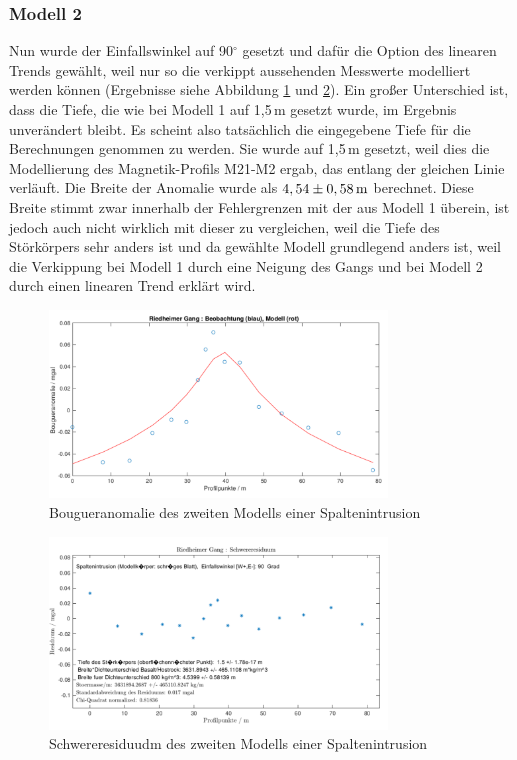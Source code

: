\subsubsection{Modell 2}

Nun wurde der Einfallswinkel auf 90$^\circ$ gesetzt und dafür die Option des linearen Trends gewählt, weil nur so die verkippt aussehenden Messwerte modelliert werden können (Ergebnisse siehe Abbildung \ref{fig:modell2} und \ref{fig:modell2_res}). Ein großer Unterschied ist, dass die Tiefe, die wie bei Modell 1 auf 1,5\,m gesetzt wurde, im Ergebnis unverändert bleibt. Es scheint also tatsächlich die eingegebene Tiefe für die Berechnungen genommen zu werden. Sie wurde auf 1,5\,m gesetzt, weil dies die Modellierung des Magnetik-Profils M21-M2 ergab, das entlang der gleichen Linie verläuft. Die Breite der Anomalie wurde als $4,54\pm0,58\,\mathrm{m}$ berechnet. Diese Breite stimmt zwar innerhalb der Fehlergrenzen mit der aus Modell 1 überein, ist jedoch auch nicht wirklich mit dieser zu vergleichen, weil die Tiefe des Störkörpers sehr anders ist und da gewählte Modell grundlegend anders ist, weil die Verkippung bei Modell 1 durch eine Neigung des Gangs und bei Modell 2 durch einen linearen Trend erklärt wird.

\begin{figure}[!ht]
 \centering
 \includegraphics[width=0.8\textwidth]{fig/modell2}
 \caption{Bougueranomalie des zweiten Modells einer Spaltenintrusion}
 \label{fig:modell2}
\end{figure}

\begin{figure}[!ht]
 \centering
 \includegraphics[width=0.8\textwidth]{fig/modell2_res}
 \caption{Schwereresiduudm des zweiten Modells einer Spaltenintrusion}
 \label{fig:modell2_res}
\end{figure}

